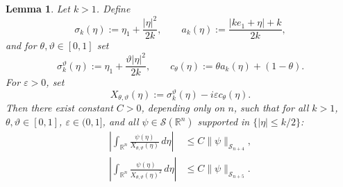 \documentclass[12pt,a4paper]{amsart}
\numberwithin{equation}{section}
\theoremstyle{plain}
\newtheorem{lemma}[theorem]{Lemma}
\theoremstyle{definition}
\begin{document}
\begin{lemma}\label{lem:aux_sing}
Let $k> 1$.  Define
\begin{equation*}
    \sigma_k(\eta):=\eta_1+\frac{|\eta|^2}{2k},
  \qquad
  a_k(\eta):=\frac{|ke_1+\eta|+k}{2k},
\end{equation*}
and for $\theta,\vartheta\in[0,1]$ set
\begin{equation}\label{eq:aux_interp}
  \sigma_k^\vartheta(\eta):=\eta_1+\frac{\vartheta|\eta|^2}{2k},
  \qquad
  c_\theta(\eta):=\theta a_k(\eta)+(1-\theta).
\end{equation}
For $\varepsilon>0$, set
\begin{equation}\label{eq:aux_X}
  X_{\theta,\vartheta}(\eta)
  :=\sigma_k^\vartheta(\eta)-i\varepsilon c_\theta(\eta).
\end{equation}
Then there exist constant $C>0$, depending only on $n$, such that for all $k>1$,
$\theta,\vartheta\in[0,1]$, $\varepsilon\in(0,1]$,
and all $\psi\in\mathscr{S}(\mathbb{R}^n)$ supported in $\{|\eta|\leq k/2\}$:
\begin{align}
  \left|\int_{\mathbb{R}^n}\frac{\psi(\eta)}{X_{\theta,\vartheta}(\eta)}\,d\eta\right|
  &\leq C\|\psi\|_{\mathscr{S}_{n+4}},
  \label{eq:aux_inv1}\\
  \left|\int_{\mathbb{R}^n}\frac{\psi(\eta)}{X_{\theta,\vartheta}(\eta)^2}\,d\eta\right|
  &\leq C\|\psi\|_{\mathscr{S}_{n+5}}.
  \label{eq:aux_inv2}
\end{align}
\end{lemma}
\end{document}
